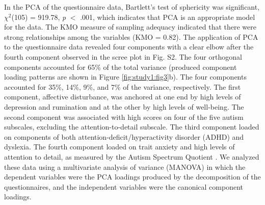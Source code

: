 In the PCA of the questionnaire data, Bartlett’s test of sphericity was significant,
$\chi^{2}$(105) = 919.78, 
\textit{p} $<$ .001, which indicates that PCA is an appropriate model for the data. The KMO measure of sampling adequacy indicated that there were strong relationships among the variables (KMO = 0.82). The application of PCA to the questionnaire data revealed four components with a clear elbow after the fourth component observed in the scree plot in Fig. S2. The four orthogonal components accounted for 65\% of the total variance (produced component loading patterns are shown in Figure \ref{fig:study1:fig3}b). The four components accounted for 35\%, 14\%, 9\%, and 7\% of the variance, respectively. The first component, affective disturbance, was anchored at one end by high levels of depression and rumination and at the other by high levels of well-being. The second component was associated with high scores on four of the five autism subscales, excluding the attention-to-detail subscale. The third component loaded on components of both attention-deficit/hyperactivity disorder (ADHD) and dyslexia. The fourth component loaded on trait anxiety and high levels of attention to detail, as measured by the Autism Spectrum Quotient \cite{Baron-Cohen2001}. We analyzed these data using a multivariate analysis of variance (MANOVA) in which the dependent variables were the PCA loadings produced by the decomposition of the questionnaires, and the independent variables were the canonical component loadings.
